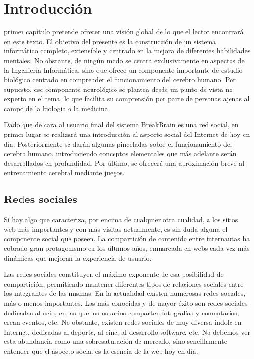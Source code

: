 \chapter{Introducción}
\label{chap:introduccion}

 primer capítulo pretende ofrecer una visión global de lo que el lector encontrará en este texto. El objetivo del presente es la construcción de un sistema informático completo, extensible y centrado en la mejora de diferentes habilidades mentales. No obstante, de ningún modo se centra exclusivamente en aspectos de la Ingeniería Informática, sino que ofrece un componente importante de estudio biológico centrado en comprender el funcionamiento del cerebro humano. Por supuesto, ese componente neurológico se plantea desde un punto de vista no experto en el tema, lo que facilita su comprensión por parte de personas ajenas al campo de la biología o la medicina.

Dado que de cara al usuario final del sistema BreakBrain es una red social, en primer lugar se realizará una introducción al aspecto social del Internet de hoy en día. Posteriormente se darán algunas pinceladas sobre el funcionamiento del cerebro humano, introduciendo conceptos elementales que más adelante serán desarrollados en profundidad. Por último, se ofrecerá una aproximación breve al entrenamiento cerebral mediante juegos.


\section{Redes sociales}

Si hay algo que caracteriza, por encima de cualquier otra cualidad, a los sitios web más importantes y con más visitas actualmente, es sin duda alguna el componente social que poseen. La compartición de contenido entre internautas ha cobrado gran protagonismo en los últimos años, enmarcada en webs cada vez más dinámicas que mejoran la experiencia de usuario. 

Las redes sociales constituyen el máximo exponente de esa posibilidad de compartición, permitiendo mantener diferentes tipos de relaciones sociales entre los integrantes de las mismas. En la actualidad existen numerosas redes sociales, más o menos importantes. Las más conocidas y de mayor éxito son redes sociales dedicadas al ocio, en las que los usuarios comparten fotografías y comentarios, crean eventos, etc. No obstante, existen redes sociales de muy diversa índole en Internet, dedicadas al deporte, al cine, al desarrollo software, etc. No debemos ver esta abundancia como una sobresaturación de mercado, sino sencillamente entender que el aspecto social es la esencia de la web hoy en día.

